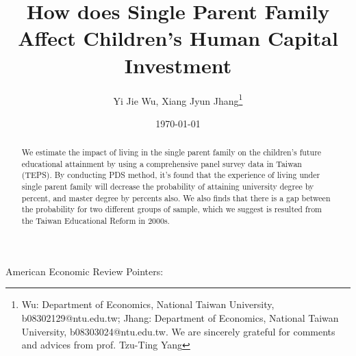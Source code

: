 \documentclass[]{AEA}
\begin{document}
\title{How does Single Parent Family Affect Children's Human Capital Investment}
\author{Yi Jie Wu, Xiang Jyun Jhang\thanks{Wu: Department of Economics, National Taiwan University, b08302129@ntu.edu.tw; Jhang: Department of Economics, National Taiwan University, b08303024@ntu.edu.tw.  We are sincerely grateful for comments and advices from prof. Tzu-Ting Yang}}
\date{\today}

\begin{abstract}
    We estimate the impact of living in the single parent family on the children's future educational attainment by using a comprehensive panel survey data in Taiwan (TEPS).  By conducting PDS method, it's found that the experience of living under single parent family will decrease the probability of attaining university degree by  percent, and master degree by  percents also.  We also finds that there is a gap between the probability for two different groups of sample, which we suggest is resulted from the Taiwan Educational Reform in 2000s.
\end{abstract}


\maketitle

American Economic Review Pointers:
\end{document}
